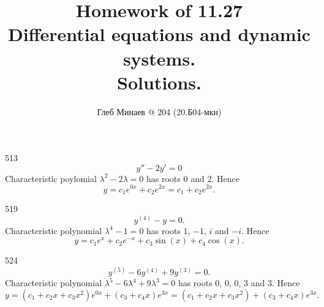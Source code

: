 \documentclass[12pt,a4paper]{article}
\title{Homework of 11.27\\Differential equations and dynamic systems.\\Solutions.}
\author{Глеб Минаев @ 204 (20.Б04-мкн)}
\date{}
\begin{document}
    \maketitle

    \begin{problem}{513}
        \[y'' - 2y' = 0\]
        Characteristic poylomial $\lambda^2 - 2\lambda = 0$ has roots $0$ and $2$. Hence
        \[y = c_1 e^{0x} + c_2 e^{2x} = c_1 + c_2 e^{2x}.\]
    \end{problem}

    \begin{problem}{519}
        \[y^{(4)} - y = 0.\]
        Characteristic polynomial $\lambda^4 - 1 = 0$ has roots $1$, $-1$, $i$ and $-i$. Hence
        \[y = c_1 e^x + c_2 e^{-x} + c_3 \sin(x) + c_4 \cos(x).\]
    \end{problem}

    \begin{problem}{524}
        \[y^{(5)} - 6 y^{(4)} + 9 y^{(3)} = 0.\]
        Characteristic polynomial $\lambda^5 - 6 \lambda^4 + 9 \lambda^3 = 0$ has roots $0$, $0$, $0$, $3$ and $3$. Hence
        \[y = (c_1 + c_2 x + c_3 x^2) e^{0x} + (c_3 + c_4 x) e^{3x} = (c_1 + c_2 x + c_3 x^2) + (c_3 + c_4 x) e^{3x}.\]
    \end{problem}
\end{document}
